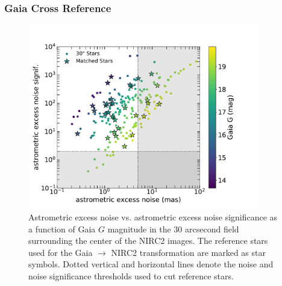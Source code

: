 \documentclass[]{spie}  %
\begin{document}
\subsubsection{Gaia Cross Reference} \label{sec:m53-gaia}

\begin{figure}[!h]
 \centering
 \includegraphics[width=0.9\textwidth]{airopa/Figures/M53_aen.pdf}
 \caption{\footnotesize Astrometric excess noise vs. astrometric excess noise significance as a function of Gaia $G$ magnitude in the 30 arcsecond field surrounding the center of the NIRC2 images. The reference stars used for the Gaia $\rightarrow$ NIRC2 transformation are marked as star symbols. Dotted vertical and horizontal lines denote the noise and noise significance thresholds used to cut reference stars.\label{fig:m53_aen}}
\end{figure}
\end{document}
